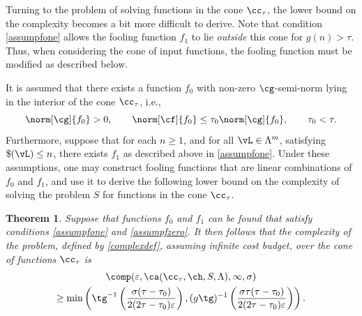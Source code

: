 \documentclass[]{elsarticle}
\newtheorem{theorem}{Theorem}
\theoremstyle{definition}
\theoremstyle{remark}
\begin{document}
Turning to the problem of solving functions in the cone $\cc_{\tau}$, the lower bound on the complexity becomes a bit more difficult to derive.  Note that condition \eqref{assumpfone} allows the fooling function $f_1$ to lie \emph{outside} this cone for $g(n) > \tau$.  Thus, when considering the cone of input functions, the fooling function must be modified as described below.

It is assumed that there exists a function $f_0$ with non-zero $\cg$-semi-norm lying in the interior of the cone $\cc_{\tau}$, i.e.,
\begin{equation}
\label{assumpfzero}
\norm[\cg]{f_{0}} > 0, \qquad \norm[\cf]{f_{0}} \le \tau_0 \norm[\cg]{f_{0}}, \qquad \tau_0 < \tau.
\end{equation}
Furthermore, suppose that for each $n \ge 1$, and for all $\vL \in \Lambda^m$, satisfying $\$(\vL)\le n$, there exists $f_1$ as described above in \eqref{assumpfone}. Under these assumptions, one may construct fooling functions that are linear combinations of $f_0$ and $f_1$, and use it to derive the following lower bound on the complexity of solving the problem $S$ for functions in the cone $\cc_{\tau}$.

\begin{theorem} \label{complowbd} Suppose that functions $f_{0}$ and $f_1$ can be found that satisfy conditions \eqref{assumpfone} and \eqref{assumpfzero}.  It then follows that the complexity of the problem, defined by \eqref{complexdef}, assuming infinite cost budget, over the cone of functions $\cc_{\tau}$ is
\begin{multline*}
\comp(\varepsilon,\ca(\cc_{\tau},\ch,S,\Lambda),\infty,\sigma) \\
\ge \min\left(\tg^{-1}\left(\frac{\sigma(\tau-\tau_0)}{2(2\tau-\tau_0)\varepsilon}\right), (g\tg)^{-1}\left(\frac{\sigma\tau(\tau-\tau_0)}{2(2\tau-\tau_0)\varepsilon}\right) \right).
\end{multline*}
\end{theorem}
\end{document}
